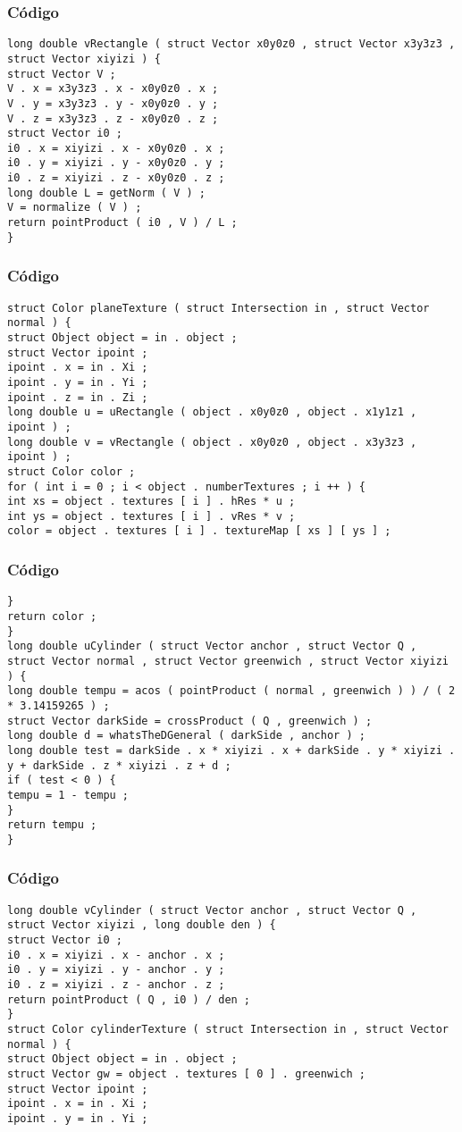 \documentclass{beamer}
\begin{document}
\begin{frame}[fragile]
\frametitle{C\'odigo}
\begin{verbatim}
long double vRectangle ( struct Vector x0y0z0 , struct Vector x3y3z3 , struct Vector xiyizi ) { 
struct Vector V ; 
V . x = x3y3z3 . x - x0y0z0 . x ; 
V . y = x3y3z3 . y - x0y0z0 . y ; 
V . z = x3y3z3 . z - x0y0z0 . z ; 
struct Vector i0 ; 
i0 . x = xiyizi . x - x0y0z0 . x ; 
i0 . y = xiyizi . y - x0y0z0 . y ; 
i0 . z = xiyizi . z - x0y0z0 . z ; 
long double L = getNorm ( V ) ; 
V = normalize ( V ) ; 
return pointProduct ( i0 , V ) / L ; 
} 
\end{verbatim}
\end{frame}
\begin{frame}[fragile]
\frametitle{C\'odigo}
\begin{verbatim}
struct Color planeTexture ( struct Intersection in , struct Vector normal ) { 
struct Object object = in . object ; 
struct Vector ipoint ; 
ipoint . x = in . Xi ; 
ipoint . y = in . Yi ; 
ipoint . z = in . Zi ; 
long double u = uRectangle ( object . x0y0z0 , object . x1y1z1 , ipoint ) ; 
long double v = vRectangle ( object . x0y0z0 , object . x3y3z3 , ipoint ) ; 
struct Color color ; 
for ( int i = 0 ; i < object . numberTextures ; i ++ ) { 
int xs = object . textures [ i ] . hRes * u ; 
int ys = object . textures [ i ] . vRes * v ; 
color = object . textures [ i ] . textureMap [ xs ] [ ys ] ; 
\end{verbatim}
\end{frame}
\begin{frame}[fragile]
\frametitle{C\'odigo}
\begin{verbatim}
} 
return color ; 
} 
long double uCylinder ( struct Vector anchor , struct Vector Q , struct Vector normal , struct Vector greenwich , struct Vector xiyizi ) { 
long double tempu = acos ( pointProduct ( normal , greenwich ) ) / ( 2 * 3.14159265 ) ; 
struct Vector darkSide = crossProduct ( Q , greenwich ) ; 
long double d = whatsTheDGeneral ( darkSide , anchor ) ; 
long double test = darkSide . x * xiyizi . x + darkSide . y * xiyizi . y + darkSide . z * xiyizi . z + d ; 
if ( test < 0 ) { 
tempu = 1 - tempu ; 
} 
return tempu ; 
} 
\end{verbatim}
\end{frame}
\begin{frame}[fragile]
\frametitle{C\'odigo}
\begin{verbatim}
long double vCylinder ( struct Vector anchor , struct Vector Q , struct Vector xiyizi , long double den ) { 
struct Vector i0 ; 
i0 . x = xiyizi . x - anchor . x ; 
i0 . y = xiyizi . y - anchor . y ; 
i0 . z = xiyizi . z - anchor . z ; 
return pointProduct ( Q , i0 ) / den ; 
} 
struct Color cylinderTexture ( struct Intersection in , struct Vector normal ) { 
struct Object object = in . object ; 
struct Vector gw = object . textures [ 0 ] . greenwich ; 
struct Vector ipoint ; 
ipoint . x = in . Xi ; 
ipoint . y = in . Yi ; 
\end{verbatim}
\end{frame}
\end{document}
